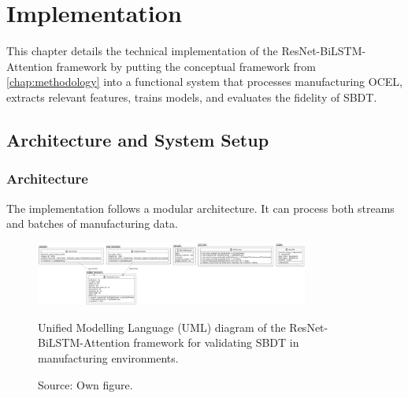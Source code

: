 \chapter{Implementation}
\label{chap:implementation}
This chapter details the technical implementation of the ResNet-BiLSTM-Attention framework \autocite{Fischer2025ResNetBiLSTM} by putting the conceptual framework from \autoref{chap:methodology} into a functional system that processes manufacturing OCEL, extracts relevant features, trains models, and evaluates the fidelity of SBDT.

\section{Architecture and System Setup}

\subsection{Architecture}
The implementation follows a modular architecture. It can process both streams and batches of manufacturing data.

\begin{figure}[htbp]
    \centering
    \includegraphics[width=0.8\textwidth]{figures/code.png}
    \caption{Unified Modelling Language (UML) diagram of the ResNet-BiLSTM-Attention framework for validating SBDT in manufacturing environments.}
    \caption*{Source: Own figure.}
    \label{fig:uml-diagram}
\end{figure}

